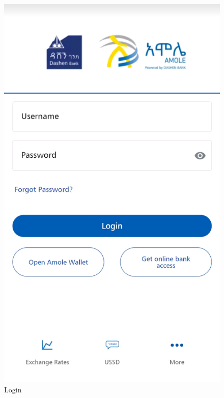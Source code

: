 \documentclass[a4paper,12pt]{report}
\begin{document}
\begin{figure}[h]
  \centering
  \begin{minipage}[b]{0.3\textwidth}
    \includegraphics[width=\linewidth]{../images/screenshots/amole-lite/amole_login.png}
    \caption{Login}
  \end{minipage}
  \hfill
  \begin{minipage}[b]{0.3\textwidth}

\end{minipage}
\end{figure}
\end{document}
